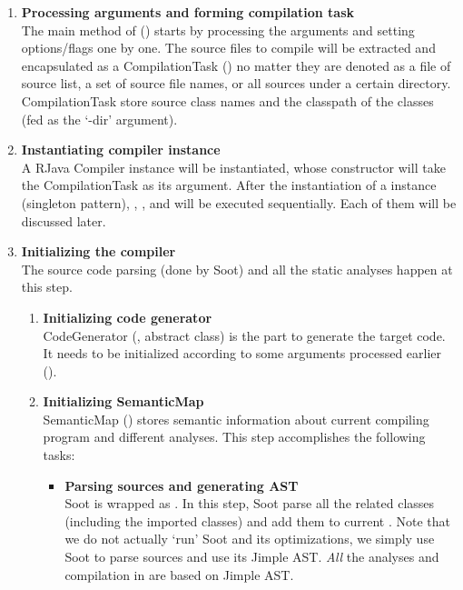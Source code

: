 \documentclass[12pt]{article}
\begin{document}
\begin{enumerate}
\item
\textbf{Processing arguments and forming compilation task\\}
The main method of \rjcfull
()
starts by processing the arguments and 
setting options/flags one by one. The source files to compile
will be extracted and encapsulated as a CompilationTask
()
no matter they are denoted as a file of source list, 
a set of source file names, or all sources under a certain directory. 
CompilationTask store source class names and the
classpath of the classes (fed as the `-dir' argument). 

\item
\textbf{Instantiating compiler instance\\}
A RJava Compiler instance will be instantiated, whose
constructor will take the CompilationTask as its
argument. After the instantiation of a 
 instance
(singleton pattern), 
, , and 
 will be executed sequentially. 
Each of them will be discussed later. 

\item
\textbf{Initializing the compiler\\}
The source code parsing (done by Soot) 
and all the static analyses happen at this step. 
  \begin{enumerate}
  \item
  \textbf{Initializing code generator\\}
  CodeGenerator (, 
  abstract class) is the part to generate the target code. It needs to
  be initialized according to some arguments processed earlier
  ().
  \item
  \textbf{Initializing SemanticMap\\}
  SemanticMap ()
  stores semantic information about current compiling program
  and different analyses. This step accomplishes the following tasks:
    \begin{itemize}

    \item
    \textbf{Parsing sources and generating AST\\}
    Soot is wrapped as .
    In this step, Soot parse all the related classes 
    (including the imported classes) and add them to
    current . 
    Note that we do not
    actually `run' Soot and its optimizations, we simply use
    Soot to parse sources and use its Jimple AST. 
    \emph{All} the analyses and
    compilation in \rjcfull are based on Jimple AST. 
    

\end{itemize}
\end{enumerate}
\end{enumerate}
\end{document}

